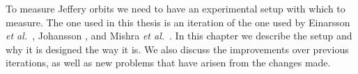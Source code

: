 To measure Jeffery orbits we need to have an experimental setup with which to measure. The one used in this thesis is an iteration of the one used by Einarsson \emph{et al.}~\cite{JonasExperiment}, Johansson \cite{AntonThesis}, and Mishra \emph{et al.}~\cite{Mishra}. In this chapter we describe the setup and why it is designed the way it is. We also discuss the improvements over previous iterations, as well as new problems that have arisen from the changes made.